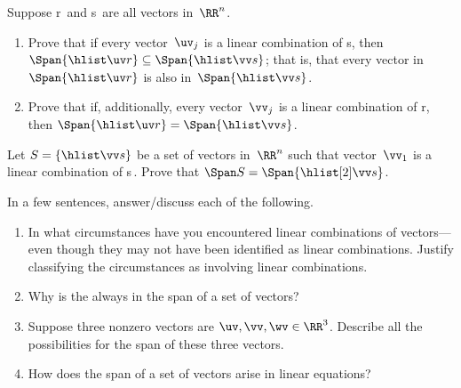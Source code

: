 \begin{exercise}  
Suppose \hlist\uv r\ and \hlist\vv s\ are all vectors in~\(\RR^n\).
\begin{enumerate}
\item Prove that if every vector~\(\uv_j\) is a linear combination of \hlist\vv s, then \(\Span\{\hlist\uv r\}\subseteq\Span\{\hlist\vv s\}\); that is, that every vector in~\(\Span\{\hlist\uv r\}\) is also in~\(\Span\{\hlist\vv s\}\).
\item  Prove that if, additionally, every vector~\(\vv_j\) is a linear combination of \hlist\uv r, then \(\Span\{\hlist\uv r\}=\Span\{\hlist\vv s\}\).
\end{enumerate}
\end{exercise}





\begin{exercise}  
Let \(S=\{\hlist\vv s\}\) be a set of vectors in~\(\RR^n\) such that vector~\(\vv_1\) is a linear combination of \hlist[2]\vv s\,.  
Prove that \(\Span S=\Span\{\hlist[2]\vv s\}\).
\end{exercise}







\begin{exercise}  
In a few sentences, answer\slash discuss each of the following.
\begin{enumerate}
\item In what circumstances have you encountered linear combinations of vectors---even though they may not have been identified as linear combinations.
Justify classifying the circumstances as involving linear combinations. 

\item Why is the  always in the span of a set of vectors?

\item Suppose three nonzero vectors are \(\uv,\vv,\wv\in\RR^3\).  
Describe all the possibilities for the span of these three vectors.

\item How does the span of a set of vectors arise in linear equations?

\end{enumerate}
\end{exercise}

\begin{comment}%
why, what caused X?
how did X occur?
what-if? what-if-not?
how does X compare with Y?
what is the evidence for X?
why is X important?
\end{comment}



